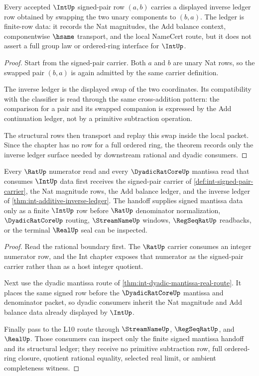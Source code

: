 \begin{theorem}
\label{thm:int-additive-inverse-ledger}
Every accepted $\IntUp$ signed-pair row $(a,b)$ carries a displayed inverse ledger row obtained by swapping the two unary components to $(b,a)$. The ledger is finite-row data: it records the Nat magnitudes, the Add balance context, componentwise $\hsame$ transport, and the local NameCert route, but it does not assert a full group law or ordered-ring interface for $\IntUp$.
\end{theorem}
\begin{proof}
Start from the signed-pair carrier. Both $a$ and $b$ are unary Nat rows, so the swapped pair $(b,a)$ is again admitted by the same carrier definition.

The inverse ledger is the displayed swap of the two coordinates. Its compatibility with the classifier is read through the same cross-addition pattern: the comparison for a pair and its swapped companion is expressed by the Add continuation ledger, not by a primitive subtraction operation.

The structural rows then transport and replay this swap inside the local packet. Since the chapter has no row for a full ordered ring, the theorem records only the inverse ledger surface needed by downstream rational and dyadic consumers.
\end{proof}

\begin{theorem}
\label{thm:int-rat-dyadic-source-handoff}
Every $\RatUp$ numerator read and every $\DyadicRatCoreUp$ mantissa read that consumes $\IntUp$ data first receives the signed-pair carrier of \autoref{def:int-signed-pair-carrier}, the Nat magnitude rows, the Add balance ledger, and the inverse ledger of \autoref{thm:int-additive-inverse-ledger}. The handoff supplies signed mantissa data only as a finite $\IntUp$ row before $\RatUp$ denominator normalization, $\DyadicRatCoreUp$ routing, $\StreamNameUp$ windows, $\RegSeqRatUp$ readbacks, or the terminal $\RealUp$ seal can be inspected.
\end{theorem}
\begin{proof}
Read the rational boundary first. The $\RatUp$ carrier consumes an integer numerator row, and the Int chapter exposes that numerator as the signed-pair carrier rather than as a host integer quotient.

Next use the dyadic mantissa route of \autoref{thm:int-dyadic-mantissa-real-route}. It places the same signed row before the $\DyadicRatCoreUp$ mantissa and denominator packet, so dyadic consumers inherit the Nat magnitude and Add balance data already displayed by $\IntUp$.

Finally pass to the L10 route through $\StreamNameUp$, $\RegSeqRatUp$, and $\RealUp$. Those consumers can inspect only the finite signed mantissa handoff and its structural ledger; they receive no primitive subtraction row, full ordered-ring closure, quotient rational equality, selected real limit, or ambient completeness witness.
\end{proof}
